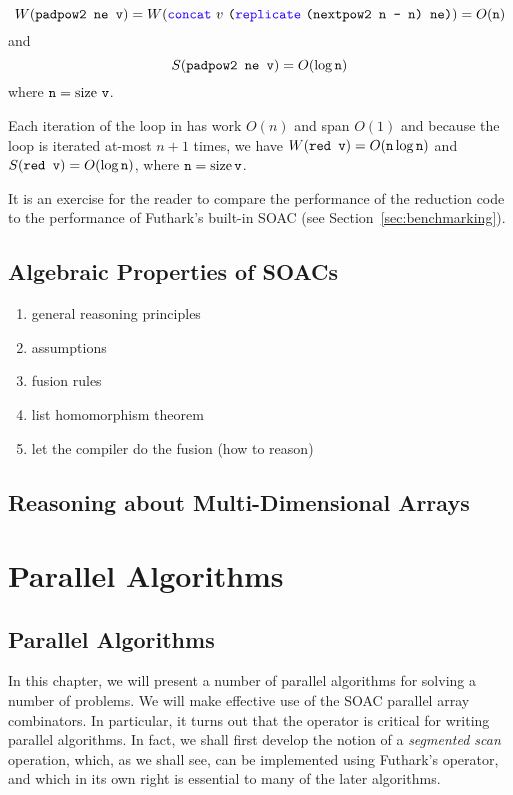 \documentclass[11pt]{book}
\newcommand{\size}{\ensuremath{\mathrm{size}}}
\renewcommand{\log}{\ensuremath{\mathrm{log}}}
\begin{document}
$$W(\kw{padpow2 ne v}) = W(\fop{concat}~v~\kw{(}\fop{replicate}~\kw{(nextpow2 n - n) ne)}) = O(\kw{n})$$
and
$$S(\kw{padpow2 ne v}) = O(\log\,\kw{n})$$
where $\kw{n} = \size~\kw{v}$.

Each iteration of the loop in  has work $O(n)$ and span $O(1)$
and because the loop is iterated at-most $n+1$ times, we have
$W(\kw{red v}) = O(\kw{n}\,\log\,\kw{n})$ and $S(\kw{red v}) =
O(\log\,\kw{n})$, where $\kw{n} = \size\,\kw{v}$.

It is an exercise for the reader to compare the performance of the
reduction code to the performance of Futhark's built-in 
SOAC (see Section~\ref{sec:benchmarking}).

\chapter{Algebraic Properties of SOACs}
\label{chap:soac-algebra}

\begin{enumerate}
\item general reasoning principles
\item assumptions
\item fusion rules
\item list homomorphism theorem
\item let the compiler do the fusion (how to reason)
\end{enumerate}

\chapter{Reasoning about Multi-Dimensional Arrays}

\part{Parallel Algorithms}

\chapter{Parallel Algorithms}
\label{chap:parallel-algorithms}

In this chapter, we will present a number of parallel algorithms for
solving a number of problems. We will make effective use of the
SOAC parallel array combinators. In particular, it turns out that the
 operator is critical for writing parallel algorithms. In
fact, we shall first develop the notion of a \emph{segmented scan}
operation, which, as we shall see, can be implemented using Futhark's 
operator, and which in its own right is essential to many of the later
algorithms.
\end{document}
